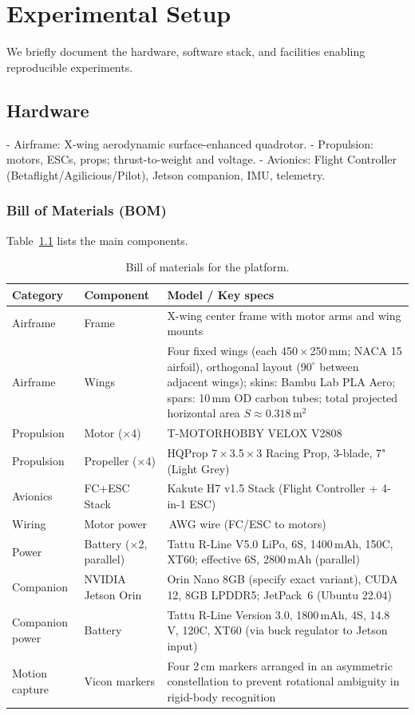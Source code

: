 
\chapter{Experimental Setup}\label{chapter:experimental-setup}

We briefly document the hardware, software stack, and facilities enabling reproducible experiments.

\section{Hardware}
- Airframe: X-wing aerodynamic surface-enhanced quadrotor.
- Propulsion: motors, ESCs, props; thrust-to-weight and voltage.
- Avionics: Flight Controller (Betaflight/Agilicious/Pilot), Jetson companion, IMU, telemetry.

\subsection{Bill of Materials (BOM)}
Table~\ref{tab:bom} lists the main components. 

\begin{table}[htbp]
	\caption[Bill of materials]{Bill of materials for the platform.}
	\label{tab:bom}
	\centering
	\setlength{\tabcolsep}{6pt}%
	\renewcommand{\arraystretch}{1.1}%
	\begin{tabularx}{\textwidth}{ll>{\raggedright\arraybackslash}X}
		Category & Component & Model / Key specs \\
		\midrule
	Airframe & Frame & X-wing center frame with motor arms and wing mounts \\
	Airframe & Wings & Four fixed wings (each 450\,×\,250\,mm; NACA 15 airfoil), orthogonal layout ($90^{\circ}$ between adjacent wings); skins: Bambu Lab PLA Aero; spars: 10\,mm OD carbon tubes; total projected horizontal area $S\approx 0.318$\,m$^2$ \\
		Propulsion & Motor ($\times$4) & T-MOTORHOBBY VELOX V2808 \\
		Propulsion & Propeller ($\times$4) & HQProp 7\,×\,3.5\,×\,3 Racing Prop, 3-blade, 7" (Light Grey) \\
		Avionics & FC+ESC Stack & Kakute H7 v1.5 Stack (Flight Controller + 4-in-1 ESC) \\
		Wiring & Motor power & 12\,AWG wire (FC/ESC to motors) \\
		Power & Battery ($\times$2, parallel) & Tattu R-Line V5.0 LiPo, 6S, 1400\,mAh, 150C, XT60; effective 6S, 2800\,mAh (parallel) \\
		Companion & NVIDIA Jetson Orin & Orin Nano 8GB (specify exact variant), CUDA 12, 8GB LPDDR5; JetPack~6 (Ubuntu 22.04) \\
		Companion power & Battery & Tattu R-Line Version 3.0, 1800\,mAh, 4S, 14.8\,V, 120C, XT60 (via buck regulator to Jetson input) \\
		Motion capture & Vicon markers & Four 2\,cm markers arranged in an asymmetric constellation to prevent rotational ambiguity in rigid-body recognition \\
		\bottomrule
	\end{tabularx}
\end{table}

